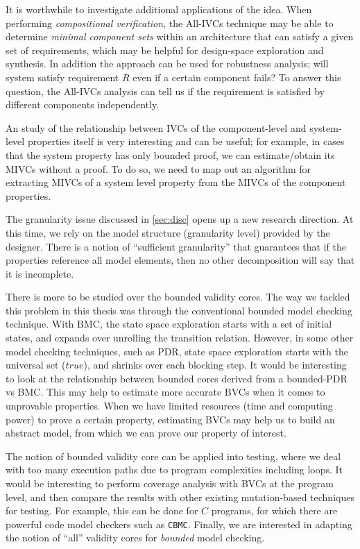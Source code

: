 It is worthwhile to investigate additional applications of the idea.  When performing {\em compositional verification}, the All-IVCs technique may be able to determine {\em minimal component sets} within an architecture that can satisfy a given set of requirements, which may be helpful for design-space exploration and synthesis. In addition the approach can be used for robustness analysis; will system satisfy requirement $R$ even if a certain component fails? To answer this question, the All-IVCs analysis can tell us if the requirement is satisfied by different components independently.


An study of the relationship between IVCs of the component-level and system-level properties itself is very interesting and can be useful; for example, in cases that the system property has only bounded proof, we can estimate/obtain its MIVCs without a proof. To do so, we need to map out an algorithm for extracting MIVCs of a system level property from the MIVCs of the component properties.

The granularity issue discussed in \ref{sec:disc} opens up a new research direction. At this time, we rely on the model structure (granularity level) provided by the designer. There is a notion of ``sufficient granularity'' that guarantees that if the properties reference all model elements, then no other decomposition will say that it is incomplete.

There is more to be studied over the bounded validity cores. The way we tackled this problem in this thesis was through the conventional bounded model checking technique. With BMC, the state space exploration starts with a set of initial states, and expands over unrolling the transition relation. However, in some other model checking techniques, such as PDR, state space exploration starts with the universal set ($true$), and shrinks over each blocking step. It would be interesting to look at the relationship between bounded cores derived from a bounded-PDR vs BMC. This may help to estimate more accurate BVCs when it comes to unprovable properties. When we have limited resources (time and computing power) to prove a certain property, estimating BVCs may help us to build an abstract model, from which we can prove our property of interest.

The notion of bounded validity core can be applied into testing, where we deal with too many execution paths due to program complexities including loops. It would be interesting to perform coverage analysis with BVCs at the program level, and then compare the results with other existing mutation-based techniques for testing. For example, this can be done for $C$ programs, for which there are powerful code model checkers such as \texttt{CBMC}. Finally, we are interested in adapting the notion of ``all'' validity cores for \emph{bounded} model checking.

